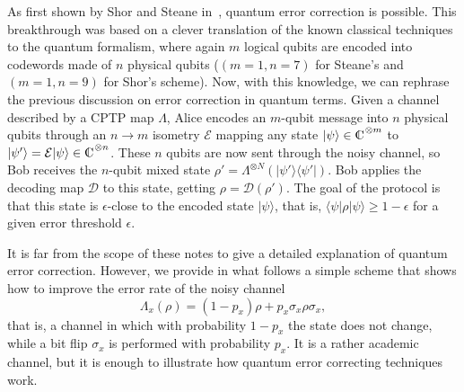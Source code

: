 \documentclass[a4paper]{article}
\def\sx{{\sigma_x}}
\def\compl{\begin{picture}(8,8)\put(0,0){C}\put(3,0.3){\line(0,1){7}}\end{picture}}
\def\bra#1{\langle#1|} \def\ket#1{|#1\rangle}
\def\proj#1{\ket{#1}\!\bra{#1}}
\begin{document}
As first shown by Shor and Steane in~\cite{errcorr}, quantum error
correction is possible. This breakthrough was based on a clever
translation of the known classical techniques to the quantum
formalism, where again $m$ logical qubits are encoded into codewords made of $n$
physical qubits ($(m=1,n=7)$ for Steane's and $(m=1,n=9)$ for Shor's scheme). Now, with this knowledge, we can rephrase the previous discussion on error correction in quantum terms. Given a channel described by a CPTP map $\Lambda$, Alice encodes an $m$-qubit message into $n$ physical qubits through an $n\rightarrow m$ isometry $\mathcal E$ mapping any state $\ket\psi\in\compl^{\otimes m}$ to $\ket{\psi'}=\mathcal E \ket{\psi}\in\compl^{\otimes n}$. These $n$ qubits are now sent through the noisy channel, so Bob receives the $n$-qubit mixed state $\rho'=\Lambda^{\otimes N}(\proj{\psi'})$. Bob applies the decoding map $\mathcal D$ to this state, getting $\rho=\mathcal D(\rho')$. The goal of the protocol is that this state is $\epsilon$-close to the encoded state $\ket\psi$, that is, $\bra\psi\rho\ket\psi\geq 1-\epsilon$ for a given error threshold $\epsilon$.



It is far from the scope of these
notes to give a detailed explanation of quantum error correction.
However, we provide in what follows a simple scheme that shows how to improve the error rate of
the noisy channel 
\begin{equation}
\Lambda_x(\rho)=(1-p_x)\rho+p_x\sx\rho\sx ,
\end{equation}
that is, a channel in which with probability $1-p_x$ the state does not change, while a bit flip $\sx$ is performed with probability $p_x$. It is a rather academic channel, but it is enough to illustrate how
quantum error correcting techniques work.
\end{document}
